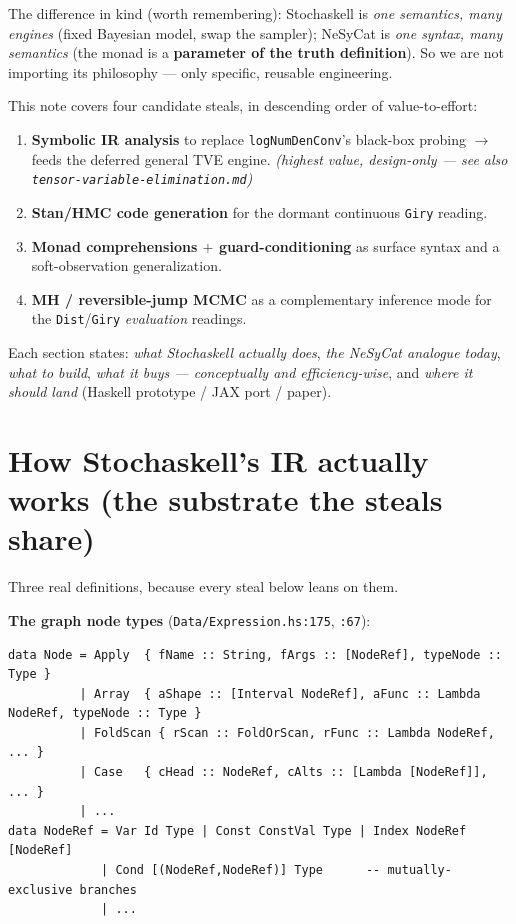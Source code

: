 \documentclass[11pt]{article}
\newcommand{\code}[1]{\texttt{#1}}
\begin{document}
The difference in kind (worth remembering): Stochaskell is \emph{one semantics, many engines} (fixed
Bayesian model, swap the sampler); NeSyCat is \emph{one syntax, many semantics} (the monad is a
\textbf{parameter of the truth definition}). So we are not importing its philosophy --- only specific,
reusable engineering.

This note covers four candidate steals, in descending order of value-to-effort:

\begin{enumerate}
  \item \textbf{Symbolic IR analysis} to replace \code{logNumDenConv}'s black-box probing $\to$ feeds
        the deferred general TVE engine. \emph{(highest value, design-only --- see also
        \code{tensor-variable-elimination.md})}
  \item \textbf{Stan/HMC code generation} for the dormant continuous \code{Giry} reading.
  \item \textbf{Monad comprehensions $+$ guard-conditioning} as surface syntax and a soft-observation
        generalization.
  \item \textbf{MH / reversible-jump MCMC} as a complementary inference mode for the \code{Dist}/\code{Giry}
        \emph{evaluation} readings.
\end{enumerate}

Each section states: \emph{what Stochaskell actually does}, \emph{the NeSyCat analogue today},
\emph{what to build}, \emph{what it buys --- conceptually and efficiency-wise}, and \emph{where it
should land} (Haskell prototype / JAX port / paper).

\section*{How Stochaskell's IR actually works (the substrate the steals share)}

Three real definitions, because every steal below leans on them.

\textbf{The graph node types} (\code{Data/Expression.hs:175}, \code{:67}):

\begin{lstlisting}
data Node = Apply  { fName :: String, fArgs :: [NodeRef], typeNode :: Type }
          | Array  { aShape :: [Interval NodeRef], aFunc :: Lambda NodeRef, typeNode :: Type }
          | FoldScan { rScan :: FoldOrScan, rFunc :: Lambda NodeRef, ... }
          | Case   { cHead :: NodeRef, cAlts :: [Lambda [NodeRef]], ... }
          | ...
data NodeRef = Var Id Type | Const ConstVal Type | Index NodeRef [NodeRef]
             | Cond [(NodeRef,NodeRef)] Type      -- mutually-exclusive branches
             | ...
\end{lstlisting}
\end{document}
